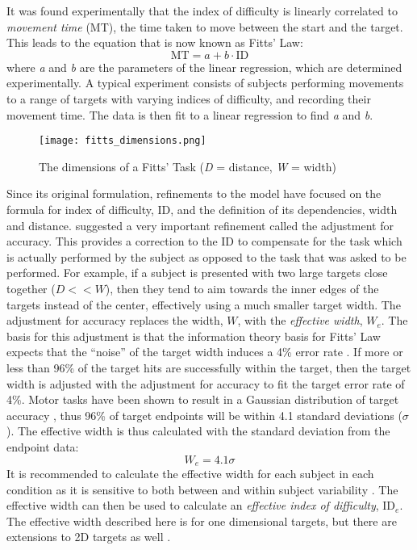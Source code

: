 It was found experimentally that the index of difficulty is linearly correlated to \emph{movement time} (MT), the time taken to move between the start and the target.
This leads to the equation that is now known as Fitts' Law:
\begin{equation}
    \mathrm{MT} = a + b \cdot \mathrm{ID}
\end{equation}
where \emph{a} and \emph{b} are the parameters of the linear regression, which are determined experimentally.
A typical experiment consists of subjects performing movements to a range of targets with varying indices of difficulty, and recording their movement time.
The data is then fit to a linear regression to find \emph{a} and \emph{b}.

\begin{figure}
    \centering
    \texttt{[image: fitts\_dimensions.png]}
    \caption{The dimensions of a Fitts' Task (\emph{D} = distance, \emph{W} = width)}
    \label{fig:intro_fitts}
\end{figure}

Since its original formulation, refinements to the model have focused on the formula for index of difficulty, \(\text{ID}\), and the definition of its dependencies, width and distance.
\citet{crossman_speed_1957} suggested a very important refinement called the adjustment for accuracy.
This provides a correction to the \(\text{ID}\) to compensate for the task which is actually performed by the subject as opposed to the task that was asked to be performed.
For example, if a subject is presented with two large targets close together ($D << W$), then they tend to aim towards the inner edges of the targets instead of the center, effectively using a much smaller target width.
The adjustment for accuracy replaces the width, \(W\), with the \emph{effective width}, \(W_{e}\).
The basis for this adjustment is that the information theory basis for Fitts' Law expects that the ``noise'' of the target width induces a 4\% error rate \citep{mackenzie_fitts_1992}.
If more or less than 96\% of the target hits are successfully within the target, then the target width is adjusted with the adjustment for accuracy to fit the target error rate of 4\%.
Motor tasks have been shown to result in a Gaussian distribution of target accuracy \citep{crossman_feedback_1983,woodworth_accuracy_1899}, thus 96\% of target endpoints will be within 4.1 standard deviations (\(\sigma\)).
The effective width is thus calculated with the standard deviation from the endpoint data:
\begin{equation}
W_{e} = 4.1\sigma
\end{equation}
It is recommended to calculate the effective width for each subject in each condition as it is sensitive to both between and within subject variability \citep{soukoreff_towards_2004}.
The effective width can then be used to calculate an \emph{effective index of difficulty}, \(\text{ID}_{e}\).
The effective width described here is for one dimensional targets, but there are extensions to 2D targets as well \citep{murata_extending_2001}.

